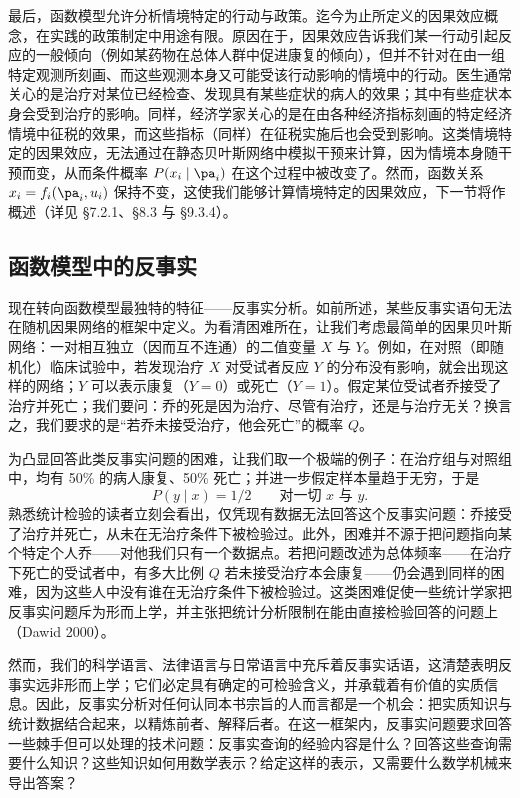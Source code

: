 最后，函数模型允许分析情境特定的行动与政策。迄今为止所定义的因果效应概念，在实践的政策制定中用途有限。原因在于，因果效应告诉我们某一行动引起反应的一般倾向（例如某药物在总体人群中促进康复的倾向），但并不针对在由一组特定观测所刻画、而这些观测本身又可能受该行动影响的情境中的行动。医生通常关心的是治疗对某位已经检查、发现具有某些症状的病人的效果；其中有些症状本身会受到治疗的影响。同样，经济学家关心的是在由各种经济指标刻画的特定经济情境中征税的效果，而这些指标（同样）在征税实施后也会受到影响。这类情境特定的因果效应，无法通过在静态贝叶斯网络中模拟干预来计算，因为情境本身随干预而变，从而条件概率 $P(x_i\mid\pa_i)$ 在这个过程中被改变了。然而，函数关系 $x_i=f_i(\pa_i,u_i)$ 保持不变，这使我们能够计算情境特定的因果效应，下一节将作概述（详见 \S 7.2.1、\S 8.3 与 \S 9.3.4）。

\subsection{函数模型中的反事实}

现在转向函数模型最独特的特征——反事实分析。如前所述，某些反事实语句无法在随机因果网络的框架中定义。为看清困难所在，让我们考虑最简单的因果贝叶斯网络：一对相互独立（因而互不连通）的二值变量 $X$ 与 $Y$。例如，在对照（即随机化）临床试验中，若发现治疗 $X$ 对受试者反应 $Y$ 的分布没有影响，就会出现这样的网络；$Y$ 可以表示康复（$Y=0$）或死亡（$Y=1$）。假定某位受试者乔接受了治疗并死亡；我们要问：乔的死是因为治疗、尽管有治疗，还是与治疗无关？换言之，我们要求的是“若乔未接受治疗，他会死亡”的概率 $Q$。

为凸显回答此类反事实问题的困难，让我们取一个极端的例子：在治疗组与对照组中，均有 50\% 的病人康复、50\% 死亡；并进一步假定样本量趋于无穷，于是
\begin{equation}
P(y\mid x) = 1/2 \qquad\text{对一切 } x \text{ 与 } y. \tag{1.46}
\end{equation}
熟悉统计检验的读者立刻会看出，仅凭现有数据无法回答这个反事实问题：乔接受了治疗并死亡，从未在无治疗条件下被检验过。此外，困难并不源于把问题指向某个特定个人乔——对他我们只有一个数据点。若把问题改述为总体频率——在治疗下死亡的受试者中，有多大比例 $Q$ 若未接受治疗本会康复——仍会遇到同样的困难，因为这些人中没有谁在无治疗条件下被检验过。这类困难促使一些统计学家把反事实问题斥为形而上学，并主张把统计分析限制在能由直接检验回答的问题上（Dawid 2000）。

然而，我们的科学语言、法律语言与日常语言中充斥着反事实话语，这清楚表明反事实远非形而上学；它们必定具有确定的可检验含义，并承载着有价值的实质信息。因此，反事实分析对任何认同本书宗旨的人而言都是一个机会：把实质知识与统计数据结合起来，以精炼前者、解释后者。在这一框架内，反事实问题要求回答一些棘手但可以处理的技术问题：反事实查询的经验内容是什么？回答这些查询需要什么知识？这些知识如何用数学表示？给定这样的表示，又需要什么数学机械来导出答案？

